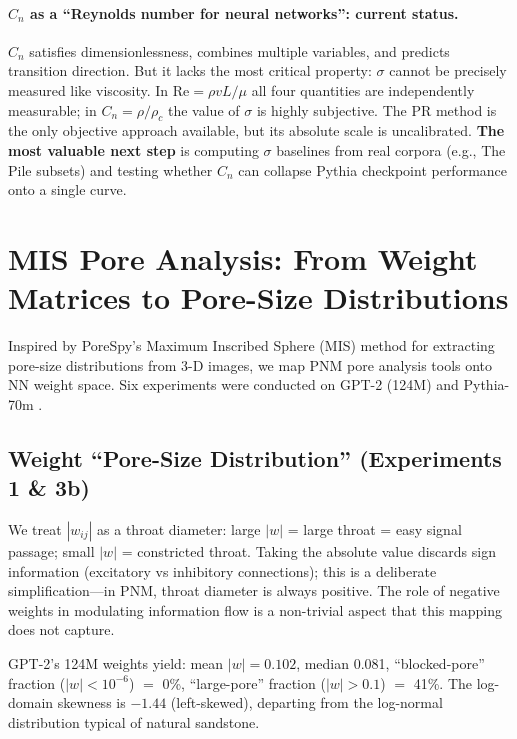 \documentclass[11pt,a4paper]{article}
\newcommand{\rhoc}{\rho_c}
\begin{document}
\paragraph{$C_n$ as a ``Reynolds number for neural networks'': current status.}
$C_n$ satisfies dimensionlessness, combines multiple variables, and predicts transition direction. But it lacks the most critical property: $\sigma$ cannot be precisely measured like viscosity. In $\text{Re}=\rho vL/\mu$ all four quantities are independently measurable; in $C_n=\rho/\rhoc$ the value of $\sigma$ is highly subjective. The PR method is the only objective approach available, but its absolute scale is uncalibrated. \textbf{The most valuable next step} is computing $\sigma$ baselines from real corpora (e.g., The Pile subsets) and testing whether $C_n$ can collapse Pythia checkpoint performance onto a single curve.

\section{MIS Pore Analysis: From Weight Matrices to Pore-Size Distributions}
\label{sec:mis}

Inspired by PoreSpy's \citep{gostick2019porespy} Maximum Inscribed Sphere (MIS)
method for extracting pore-size distributions from 3-D images, we map PNM pore
analysis tools onto NN weight space. Six experiments were conducted on
GPT-2 (124M) and Pythia-70m \citep{biderman2023pythia}.

\subsection{Weight ``Pore-Size Distribution'' (Experiments 1 \& 3b)}

We treat $|w_{ij}|$ as a throat diameter: large $|w|$ = large throat =
easy signal passage; small $|w|$ = constricted throat. Taking the absolute
value discards sign information (excitatory vs inhibitory connections);
this is a deliberate simplification---in PNM, throat diameter is always
positive. The role of negative weights in modulating information flow is
a non-trivial aspect that this mapping does not capture.

GPT-2's 124M weights yield: mean $|w|=0.102$, median 0.081,
``blocked-pore'' fraction ($|w|<10^{-6}$) $=$ 0\%, ``large-pore'' fraction
($|w|>0.1$) $=$ 41\%. The log-domain skewness is $-1.44$ (left-skewed),
departing from the log-normal distribution typical of natural sandstone.
\end{document}
